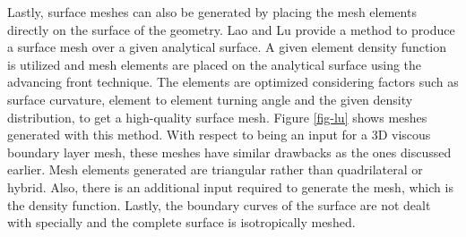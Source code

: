 
Lastly, surface meshes can also be generated by placing the mesh elements directly on the surface of the geometry. Lao and Lu \cite{lan1996finite} provide a method to produce a surface mesh over a given analytical surface. A given element density function is utilized and mesh elements are placed on the analytical surface using the advancing front technique. The elements are optimized considering factors such as surface curvature, element to element turning angle and the given density distribution, to get a high-quality surface mesh. Figure \ref{fig-lu} shows meshes generated with this method. With respect to being an input for a 3D viscous boundary layer mesh, these meshes have similar drawbacks as the ones discussed earlier. Mesh elements generated are triangular rather than quadrilateral or hybrid. Also, there is an additional input required to generate the mesh, which is the density function. Lastly, the boundary curves of the surface are not dealt with specially and the complete surface is isotropically meshed.

